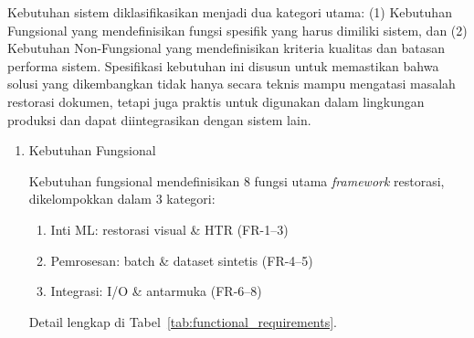 \documentclass[12pt,a4paper]{article}
\begin{document}
Kebutuhan sistem diklasifikasikan menjadi dua kategori utama: (1) Kebutuhan Fungsional yang mendefinisikan fungsi spesifik yang harus dimiliki sistem, dan (2) Kebutuhan Non-Fungsional yang mendefinisikan kriteria kualitas dan batasan performa sistem. Spesifikasi kebutuhan ini disusun untuk memastikan bahwa solusi yang dikembangkan tidak hanya secara teknis mampu mengatasi masalah restorasi dokumen, tetapi juga praktis untuk digunakan dalam lingkungan produksi dan dapat diintegrasikan dengan sistem lain.
\begin{enumerate}[label=\arabic*., leftmargin=*]

\item Kebutuhan Fungsional

Kebutuhan fungsional mendefinisikan 8 fungsi utama \textit{framework} restorasi, dikelompokkan dalam 3 kategori:

\begin{enumerate}[label=(\alph*), nosep]
    \item Inti ML: restorasi visual \& HTR (FR-1--3)
    \item Pemrosesan: batch \& dataset sintetis (FR-4--5)
    \item Integrasi: I/O \& antarmuka (FR-6--8)
\end{enumerate}

Detail lengkap di Tabel~\ref{tab:functional_requirements}.


\end{enumerate}
\end{document}
